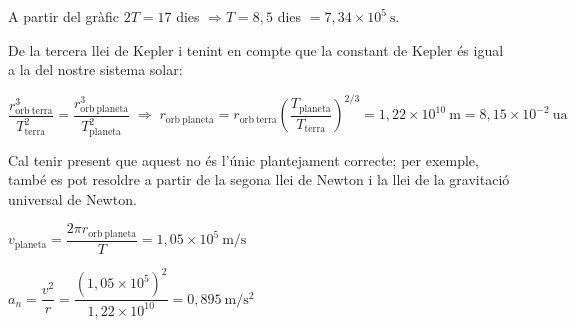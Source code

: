 \begin{solapartat}
 A partir del gràfic $2T = 17$ dies $\Rightarrow T = 8,5$ dies $= 7,34\times 10^{5}\ \mathrm{s}$.

De la tercera llei de Kepler i tenint en compte que la constant de Kepler és igual a la del nostre sistema solar:

\[ \frac{r_\mathrm{orb\ terra}^3}{T_\mathrm{terra}^2} = \frac{r_\mathrm{orb\ planeta}^3}{T_\mathrm{planeta}^2} \;\Rightarrow\; r_\mathrm{orb\ planeta} = r_\mathrm{orb\ terra}\left(\frac{T_\mathrm{planeta}}{T_\mathrm{terra}}\right)^{2/3} = 1,22\times 10^{10}\ \mathrm{m} = 8,15\times 10^{-2}\ \mathrm{ua} \]

Cal tenir present que aquest no és l'únic plantejament correcte; per exemple, també es pot resoldre a partir de la segona llei de Newton i la llei de la gravitació universal de Newton.
\end{solapartat}

\begin{solapartat}
 $v_\mathrm{planeta} = \dfrac{2\pi r_\mathrm{orb\ planeta}}{T} = 1,05\times 10^{5}\ \mathrm{m/s}$ 

 $a_n = \dfrac{v^2}{r} = \dfrac{(1,05\times 10^{5})^2}{1,22\times 10^{10}} = 0,895\ \mathrm{m/s^2}$ 
\end{solapartat}
